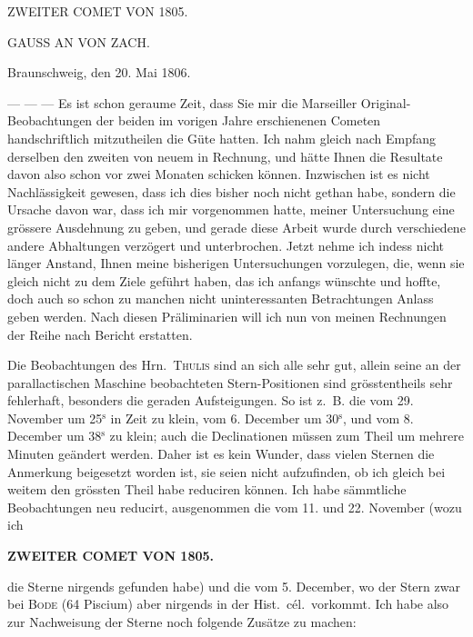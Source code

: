 \par{}\bigskip
\hypertarget{native-275-lower}{}
\begin{center}
\large ZWEITER COMET VON 1805.
\end{center}

\begin{center}
GAUSS AN VON ZACH.
\end{center}
\begin{flushright}
Braunschweig, den 20. Mai 1806.
\end{flushright}

\par\indent --- --- --- Es ist schon geraume Zeit, dass Sie mir die Marseiller Original-Beobachtungen der beiden im vorigen Jahre erschienenen Cometen handschriftlich mitzutheilen die Güte hatten. Ich nahm gleich nach Empfang derselben den zweiten von neuem in Rechnung, und hätte Ihnen die Resultate davon also schon vor zwei Monaten schicken können. Inzwischen ist es nicht Nachlässigkeit gewesen, dass ich dies bisher noch nicht gethan habe, sondern die Ursache davon war, dass ich mir vorgenommen hatte, meiner Untersuchung eine grössere Ausdehnung zu geben, und gerade diese Arbeit wurde durch verschiedene andere Abhaltungen verzögert und unterbrochen. Jetzt nehme ich indess nicht länger Anstand, Ihnen meine bisherigen Untersuchungen vorzulegen, die, wenn sie gleich nicht zu dem Ziele geführt haben, das ich anfangs wünschte und hoffte, doch auch so schon zu manchen nicht uninteressanten Betrachtungen Anlass geben werden. Nach diesen Präliminarien will ich nun von meinen Rechnungen der Reihe nach Bericht erstatten.

\par\indent Die Beobachtungen des Hrn.~\textsc{Thulis} sind an sich alle sehr gut, allein seine an der parallactischen Maschine beobachteten Stern-Positionen sind grösstentheils sehr fehlerhaft, besonders die geraden Aufsteigungen. So ist z.~B. die vom 29. November um 25$^{\mathrm{s}}$ in Zeit zu klein, vom 6. December um 30$^{\mathrm{s}}$, und vom 8. December um 38$^{\mathrm{s}}$ zu klein; auch die Declinationen müssen zum Theil um mehrere Minuten geändert werden. Daher ist es kein Wunder, dass vielen Sternen die Anmerkung beigesetzt worden ist, sie seien nicht aufzufinden, ob ich gleich bei weitem den grössten Theil habe reduciren können. Ich habe sämmtliche Beobachtungen neu reducirt, ausgenommen die vom 11. und 22. November (wozu ich
\par\clearpage
\thispagestyle{empty}
\noindent{}%
\makebox[12mm][l]{}%
\parbox[t]{\dimexpr\linewidth-24mm\relax}{\centering\footnotesize\bfseries ZWEITER COMET VON 1805.\par}%
\par\nobreak\medskip
\noindent die Sterne nirgends gefunden habe) und die vom 5. December, wo der Stern zwar bei \textsc{Bode} (64 Piscium)
aber nirgends in der Hist.\ cél.\ vorkommt. Ich habe also zur Nachweisung der Sterne noch folgende
Zusätze zu machen:

